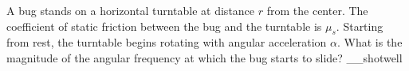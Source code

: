 A bug stands on a horizontal turntable at distance $r$ from the center.
The coefficient of static friction between the bug and the turntable
is $\mu_s$. Starting from rest, the turntable begins rotating with
angular acceleration $\alpha$. What is the magnitude of the angular frequency at which
the bug starts to slide?
__shotwell
\answercheck
